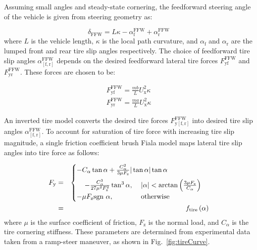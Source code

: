 \documentclass[10pt,a4paper]{article}
\begin{document}
Assuming small angles and steady-state cornering, the feedforward steering angle of the vehicle is given from steering geometry as:

\begin{equation}
\label{eqn:ffw}
\delta_{\mathrm{FFW}} = L\kappa - \alpha_\mathrm{f}^\mathrm{FFW}+\alpha_\mathrm{r}^\mathrm{FFW}
\end{equation}
where $L$ is the vehicle length, $\kappa$ is the local path curvature, and $\alpha_\mathrm{f}$ and $\alpha_\mathrm{r}$ are the lumped front and rear tire slip angles respectively. The choice of feedforward 
tire slip angles $\alpha_\mathrm{[f,r]}^\mathrm{FFW}$ depends on the desired feedforward lateral tire forces $F_\mathrm{yf}^\mathrm{FFW}$ and $F_\mathrm{yr}^\mathrm{FFW}$. These forces are chosen to be:

\begin{subequations}
\begin{align}
  F_\mathrm{yf}^\mathrm{FFW} = \frac{mb}{L} U_\mathrm{x}^2\kappa\\
   F_\mathrm{yr}^\mathrm{FFW}=\frac{ma}{L} U_\mathrm{x}^2\kappa
   \end{align}
\end{subequations}
	
An inverted tire model converts the desired tire forces $F_\mathrm{y[f,r]}^\mathrm{FFW}$ into desired tire slip angles $\alpha_\mathrm{[f,r]}^\mathrm{FFW}$. 
To account for saturation of tire force with increasing tire slip magnitude, a single friction coefficient brush Fiala model \cite{Pacejka2012} maps lateral 
tire slip angles into tire force as follows: 

\begin{eqnarray}
\small
	F_\mathrm{y}&=&\begin{cases} -C_{\alpha}\tan\alpha + \frac{C_{\alpha}^2}{3\mu F_\mathrm{z}} |\tan\alpha| \tan\alpha \vspace{2mm} \\ \hspace{4mm}- \frac{C_{\alpha}^3}{27\mu^2F_\mathrm{z}^2}\tan^3\alpha,
\hspace{4mm}  |\alpha| < \arctan{\left(\frac{3\mu F_\mathrm{z}}{C_\alpha}\right)} \\ -\mu F_\mathrm{z}\text{sgn} \ \alpha, \hspace{14mm} \mathrm{otherwise} \end{cases} \nonumber\\
&=&f_{\mathrm{tire}}\left(\alpha\right) \label{eqn:fiala}
\end{eqnarray}
where $\mu$ is the surface coefficient of friction, $F_\mathrm{z}$ is the normal load, and $C_\alpha$ is the tire cornering stiffness. 
These parameters are determined from experimental data taken from a ramp-steer maneuver, as shown in Fig.~\ref{fig:tireCurve}.
\end{document}
